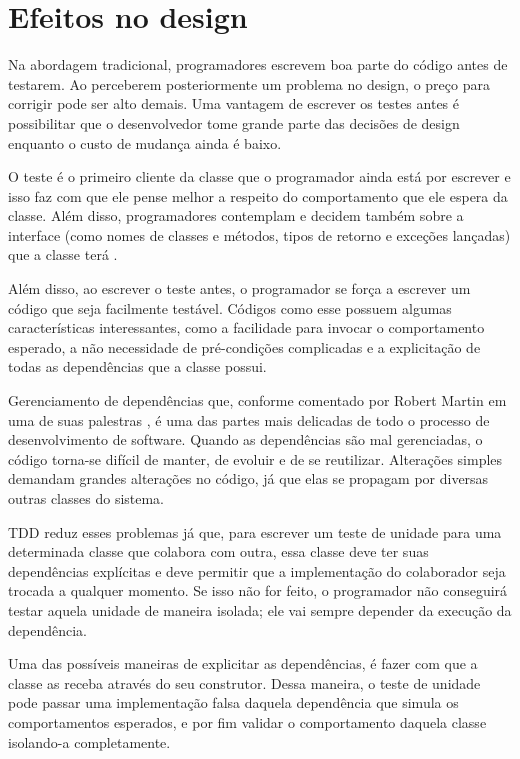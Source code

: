\section{Efeitos no design}

Na abordagem tradicional, programadores escrevem boa parte do código antes de
testarem. Ao perceberem posteriormente um problema no design, o preço para
corrigir pode ser alto demais. Uma vantagem de escrever os testes antes é
possibilitar que o desenvolvedor tome grande parte das decisões de design
enquanto o custo de mudança ainda é baixo.

O teste é o primeiro cliente da
classe que o programador ainda está por escrever e isso faz com que ele pense
melhor a respeito do comportamento que ele espera da classe. Além disso,
programadores contemplam e decidem também sobre a interface (como nomes de
classes e métodos, tipos de retorno e exceções lançadas) que a classe terá
\cite{tdd-influence}.

Além disso, ao escrever o teste antes, o programador se força a escrever um
código que seja facilmente testável. Códigos como esse possuem algumas
características interessantes, como a facilidade para invocar o comportamento
esperado, a não necessidade de pré-condições complicadas e a explicitação de
todas as dependências que a classe possui.

Gerenciamento de dependências que, conforme comentado por Robert Martin em uma
de suas palestras \cite{bobmartin-infoq}, é uma das partes mais delicadas de
todo o processo de desenvolvimento de software. Quando as dependências são mal
gerenciadas, o código torna-se difícil de manter, de evoluir e de se reutilizar.
Alterações simples demandam grandes alterações no código, já que elas se
propagam por diversas outras classes do sistema.

TDD reduz esses problemas já que, para escrever um teste de unidade para uma
determinada classe que colabora com outra, essa classe deve ter suas
dependências explícitas e deve permitir que a implementação do colaborador seja
trocada a qualquer momento. Se isso não for feito, o programador não conseguirá
testar aquela unidade de maneira isolada; ele vai sempre depender da execução da
dependência.

Uma das possíveis maneiras de explicitar as dependências, é fazer com que a
classe as receba através do seu construtor. Dessa maneira, o teste de unidade
pode passar uma implementação falsa daquela dependência que simula os
comportamentos esperados, e por fim validar o comportamento daquela classe
isolando-a completamente.

